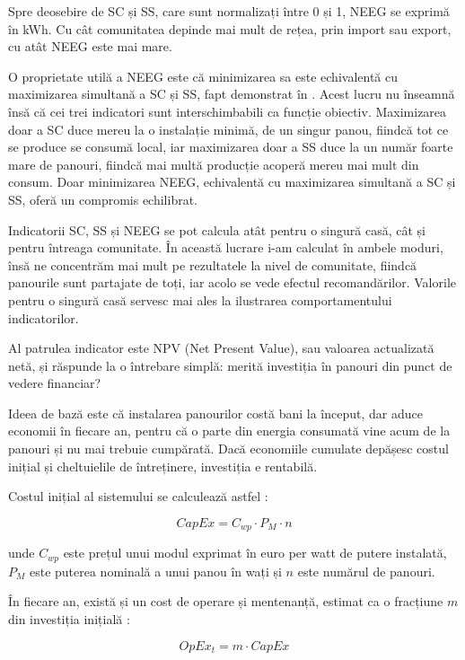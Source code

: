 \documentclass[12pt,a4paper]{report}
\begin{document}
Spre deosebire de SC și SS, care sunt normalizați între 0 și 1, NEEG se exprimă în kWh. Cu cât comunitatea depinde mai mult de rețea, prin import sau export, cu atât NEEG este mai mare.

O proprietate utilă a NEEG este că minimizarea sa este echivalentă cu maximizarea simultană a SC și SS, fapt demonstrat în \cite{simoiu2021jcp}. Acest lucru nu înseamnă însă că cei trei indicatori sunt interschimbabili ca funcție obiectiv. Maximizarea doar a SC duce mereu la o instalație minimă, de un singur panou, fiindcă tot ce se produce se consumă local, iar maximizarea doar a SS duce la un număr foarte mare de panouri, fiindcă mai multă producție acoperă mereu mai mult din consum. Doar minimizarea NEEG, echivalentă cu maximizarea simultană a SC și SS, oferă un compromis echilibrat.

Indicatorii SC, SS și NEEG se pot calcula atât pentru o singură casă, cât și pentru întreaga comunitate. În această lucrare i-am calculat în ambele moduri, însă ne concentrăm mai mult pe rezultatele la nivel de comunitate, fiindcă panourile sunt partajate de toți, iar acolo se vede efectul recomandărilor. Valorile pentru o singură casă servesc mai ales la ilustrarea comportamentului indicatorilor.

Al patrulea indicator este NPV (Net Present Value), sau valoarea actualizată netă, și răspunde la o întrebare simplă: merită investiția în panouri din punct de vedere financiar?

Ideea de bază este că instalarea panourilor costă bani la început, dar aduce economii în fiecare an, pentru că o parte din energia consumată vine acum de la panouri și nu mai trebuie cumpărată. Dacă economiile cumulate depășesc costul inițial și cheltuielile de întreținere, investiția e rentabilă.

Costul inițial al sistemului se calculează astfel \cite{simoiu2021jcp}:

\begin{equation}
  CapEx = C_{wp} \cdot P_M \cdot n
  \label{eq:capex}
\end{equation}

unde $C_{wp}$ este prețul unui modul exprimat în euro per watt de putere instalată, $P_M$ este puterea nominală a unui panou în wați și $n$ este numărul de panouri.

În fiecare an, există și un cost de operare și mentenanță, estimat ca o fracțiune $m$ din investiția inițială \cite{simoiu2021jcp}:

\begin{equation}
  OpEx_t = m \cdot CapEx
  \label{eq:opex}
\end{equation}
\end{document}

